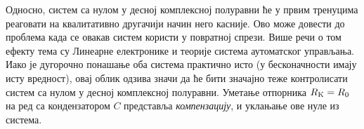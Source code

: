 Односно, систем са нулом у десној комплексној полуравни ће у 
првим тренуцима реаговати на квалитативно другачији начин него касније. Ово може довести до проблема када се овакав систем користи у повратној спрези. 
Више речи о том ефекту тема су Линеарне електронике и теорије система аутоматског управљања. Иако је дугорочно понашање оба система практично исто 
(у бесконачности имају исту вредност), овај облик одзива значи да ће бити значајно теже контролисати систем са нулом у десној комплексној полуравни. 
Уметање отпорника $R_{\rm K} = R_0$ на ред са кондензатором $C$ представља \textit{компензацију}, и уклањање ове нуле из система.